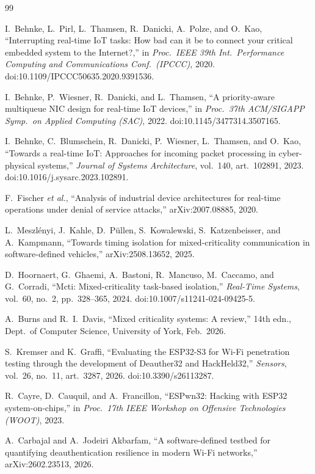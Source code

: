 \begin{thebibliography}{99}
\small

 I.~Behnke, L.~Pirl, L.~Thamsen, R.~Danicki, A.~Polze, and O.~Kao,
``Interrupting real-time IoT tasks: How bad can it be to connect your critical embedded system to
the Internet?,'' in \emph{Proc.\ IEEE 39th Int.\ Performance Computing and Communications Conf.\
(IPCCC)}, 2020. doi:10.1109/IPCCC50635.2020.9391536.

 I.~Behnke, P.~Wiesner, R.~Danicki, and L.~Thamsen, ``A priority-aware
multiqueue NIC design for real-time IoT devices,'' in \emph{Proc.\ 37th ACM/SIGAPP Symp.\ on
Applied Computing (SAC)}, 2022. doi:10.1145/3477314.3507165.

 I.~Behnke, C.~Blumschein, R.~Danicki, P.~Wiesner, L.~Thamsen, and O.~Kao,
``Towards a real-time IoT: Approaches for incoming packet processing in cyber-physical systems,''
\emph{Journal of Systems Architecture}, vol.~140, art.~102891, 2023.
doi:10.1016/j.sysarc.2023.102891.

 F.~Fischer \emph{et al.}, ``Analysis of industrial device architectures for
real-time operations under denial of service attacks,'' arXiv:2007.08885, 2020.

 L.~Meszl\'enyi, J.~Kahle, D.~P\"ullen, S.~Kowalewski, S.~Katzenbeisser,
and A.~Kampmann, ``Towards timing isolation for mixed-criticality communication in
software-defined vehicles,'' arXiv:2508.13652, 2025.

 D.~Hoornaert, G.~Ghaemi, A.~Bastoni, R.~Mancuso, M.~Caccamo, and G.~Corradi,
``Mcti: Mixed-criticality task-based isolation,'' \emph{Real-Time Systems}, vol.~60, no.~2,
pp.~328--365, 2024. doi:10.1007/s11241-024-09425-5.

 A.~Burns and R.~I.~Davis, ``Mixed criticality systems: A review,'' 14th
edn., Dept.\ of Computer Science, University of York, Feb.\ 2026.

 S.~Kremser and K.~Graffi, ``Evaluating the ESP32-S3 for Wi-Fi penetration
testing through the development of Deauther32 and HackHeld32,'' \emph{Sensors}, vol.~26, no.~11,
art.~3287, 2026. doi:10.3390/s26113287.

 R.~Cayre, D.~Cauquil, and A.~Francillon, ``ESPwn32: Hacking with ESP32
system-on-chips,'' in \emph{Proc.\ 17th IEEE Workshop on Offensive Technologies (WOOT)}, 2023.

 A.~Carbajal and A.~Jodeiri Akbarfam, ``A software-defined testbed for
quantifying deauthentication resilience in modern Wi-Fi networks,'' arXiv:2602.23513, 2026.


\end{thebibliography}
